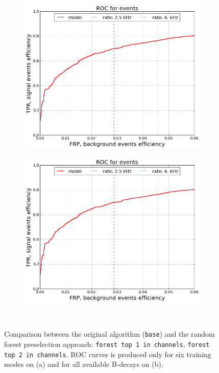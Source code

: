 \documentclass{llncs}
\begin{document}
\begin{figure}
	\begin{center}
    	\begin{subfigure}[b]{0.45\textwidth}
    		\includegraphics[width=\textwidth]{../../img/roc_events.png} \caption{}
    	\end{subfigure} %
    	\begin{subfigure}[b]{0.45\textwidth}
    		\includegraphics[width=\textwidth]{../../img/roc_events.png} \caption{} %
    	\end{subfigure}
    \end{center}
  \caption{Comparison between the original algorithm (\texttt{base}) and the random forest preselection approach: \texttt{forest top 1 in channels}, \texttt{forest top 2 in channels}. ROC curves is produced only for six training modes on (a) and for all available B-decays on (b).}~\label{fig:forest_channel}
\end{figure}
\end{document}
